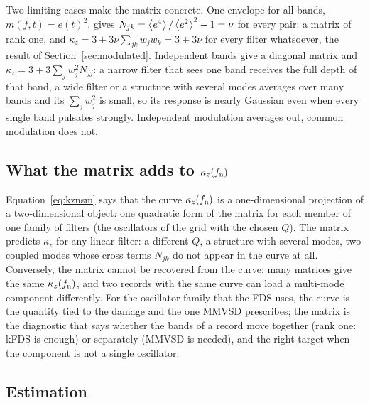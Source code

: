 Two limiting cases make the matrix concrete. One envelope for all bands, $m(f,t) = e(t)^2$, gives
$N_{jk} = \left\langle e^4 \right\rangle/\left\langle e^2 \right\rangle^2 - 1 = \nu$ for every pair: a matrix of rank one, and
$\kappa_z = 3 + 3\nu\sum_{jk}w_jw_k = 3 + 3\nu$ for every filter whatsoever, the result of
Section~\ref{sec:modulated}. Independent bands give a diagonal matrix and $\kappa_z = 3 +
3\sum_j w_j^2 N_{jj}$: a narrow filter that sees one band receives the full depth of that band, a wide
filter or a structure with several modes averages over many bands and its $\sum_j w_j^2$ is small, so
its response is nearly Gaussian even when every single band pulsates strongly. Independent modulation
averages out, common modulation does not.

\subsection{What the matrix adds to $\kappa_z(f_{\mathrm{n}})$}

Equation~\eqref{eq:kznsm} says that the curve $\kappa_z(f_{\mathrm{n}})$ is a one-dimensional projection of a
two-dimensional object: one quadratic form of the matrix for each member of one family of filters (the
oscillators of the grid with the chosen $Q$). The matrix predicts $\kappa_z$ for any linear filter: a
different $Q$, a structure with several modes, two coupled modes whose cross terms $N_{jk}$ do not
appear in the curve at all. Conversely, the matrix cannot be recovered from the curve: many matrices
give the same $\kappa_z(f_{\mathrm{n}})$, and two records with the same curve can load a multi-mode component
differently. For the oscillator family that the FDS uses, the curve is the quantity tied to the
damage and the one MMVSD prescribes; the matrix is the diagnostic that says whether the bands of a
record move together (rank one: kFDS is enough) or separately (MMVSD is needed), and the right
target when the component is not a single oscillator.

\subsection{Estimation}

